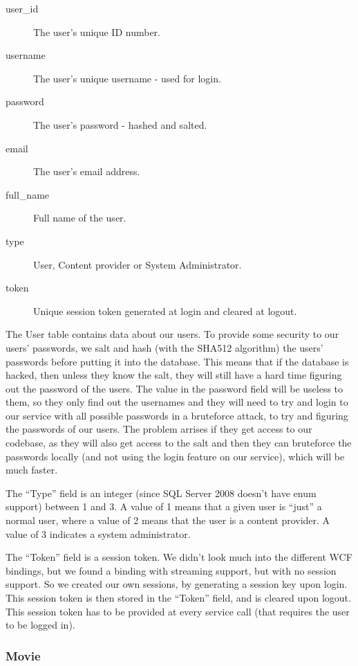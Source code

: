 \begin{description}
\item[user_id] The user's unique ID number.
\item[username] The user's unique username - used for login.
\item[password] The user's password - hashed and salted.
\item[email] The user's email address.
\item[full_name] Full name of the user.
\item[type] User, Content provider or System Administrator.
\item[token] Unique session token generated at login and cleared at logout.
\end{description}

The User table contains data about our users. To provide some security to our users' passwords, we salt and hash (with the SHA512 algorithm) the users' passwords before putting it into the database. This means that if the database is hacked, then unless they know the salt, they will still have a hard time figuring out the password of the users. The value in the password field will be useless to them, so they only find out the usernames and they will need to try and login to our service with all possible passwords in a bruteforce attack, to try and figuring the passwords of our users.
The problem arrises if they get access to our codebase, as they will also get access to the salt and then they can bruteforce the passwords locally (and not using the login feature on our service), which will be much faster.

The ``Type'' field is an integer (since SQL Server 2008 doesn't have enum support) between 1 and 3. A value of 1 means that a given user is ``just'' a normal user, where a value of 2 means that the user is a content provider. A value of 3 indicates a system administrator.

The ``Token'' field is a session token. We didn't look much into the different WCF bindings, but we found a binding with streaming support, but with no session support. So we created our own sessions, by generating a session key upon login. This session token is then stored in the ``Token'' field, and is cleared upon logout. This session token has to be provided at every service call (that requires the user to be logged in).

\subsubsection{Movie}
\label{database_design_tables_movie}

